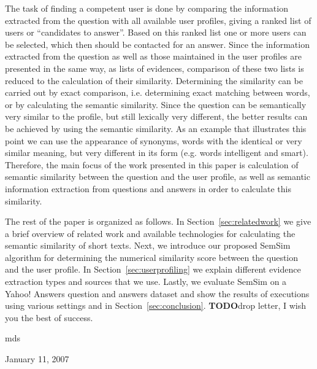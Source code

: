 \documentclass[conference]{IEEEtran}
\newcommand{\secref}[1]{Section~\ref{#1}}
\newcommand{\TODO}[0]{{\color{BrickRed}\textbf{TODO}}}
\begin{document}
The task of finding a competent user is done by comparing the information extracted from the question with all available user profiles, giving a ranked list of users or ``candidates to answer''. Based on this ranked list one or more users can be selected, which then should be contacted for an answer. Since the information extracted from the question as well as those maintained in the user profiles are presented in the same way, as lists of evidences, comparison of these two lists is reduced to the calculation of their similarity. Determining the similarity can be carried out by exact comparison, i.e. determining exact matching between words, or by calculating the semantic similarity. Since the question can be semantically very similar to the profile, but still lexically very different, the better results can be achieved by using the semantic similarity. As an example that illustrates this point we can use the appearance of synonyms, words with the identical or very similar meaning, but very different in its form (e.g. words intelligent and smart). Therefore, the main focus of the work presented in this paper is calculation of semantic similarity between the question and the user profile, as well as semantic information extraction from questions and answers in order to calculate this similarity.

The rest of the paper is organized as follows. In \secref{sec:relatedwork} we give a brief overview of related work and available technologies for calculating the semantic similarity of short texts. Next, we introduce our proposed SemSim algorithm for determining the numerical similarity score between the question and the user profile. In \secref{sec:userprofiling} we explain different evidence extraction types and sources that we use. Lastly, we evaluate SemSim on a Yahoo! Answers question and answers dataset and show the results of executions using various settings and in \secref{sec:conclusion}. 
\TODO drop letter, I wish you the best of success.

\hfill mds
 
\hfill January 11, 2007


%
%
\end{document}
